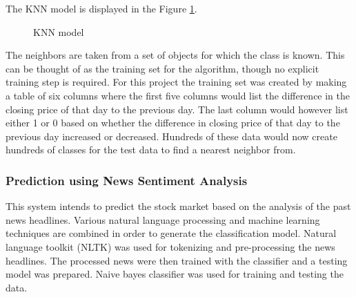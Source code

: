 The KNN model is displayed in the Figure \ref{fig:KNN}.
\begin{figure}[h!]\centering
  	\caption{KNN model}
  	\label{fig:KNN}
\end{figure}

The neighbors are taken from a set of objects for which the class is known. This can be thought of as the training set for the algorithm, though no explicit training step is required. For this project the training set was created by making a table of six columns where the first five columns would list the difference in the closing price of that day to the previous day. The last column would however list either 1 or 0 based on whether the difference in closing price of that day to the previous day increased or decreased. Hundreds of these data would now create hundreds of classes for the test data to find a nearest neighbor from.

\subsubsection{Prediction using News Sentiment Analysis}
This system intends to predict the stock market based on the analysis of the past news
headlines. Various natural language processing and machine learning techniques are combined in order to generate the classification model. Natural language toolkit (NLTK) was used for tokenizing and pre-processing the news headlines. The processed news were then trained with the classifier and a testing model was prepared. Naive bayes classifier was used for training and testing the data.

